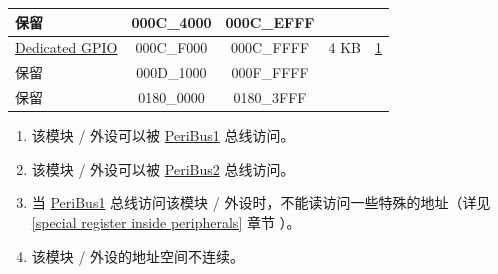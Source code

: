 \begin{longtable}[c]{ |p{5.0cm}|c|c|r|p{1.5cm}| }
    \rowcolor{gray!25}
  保留  & \hexprefix{}000C\_4000 & \hexprefix{}000C\_EFFF &        &              \\\hline
              \hyperref[mod:iomuxgpio]{Dedicated GPIO}     & \hexprefix{}000C\_F000 & \hexprefix{}000C\_FFFF &   4 KB    & \hyperref[PAM footnote: 1]{1}         \\\hline

    \rowcolor{gray!25}
   保留 & \hexprefix{}000D\_1000 & \hexprefix{}000F\_FFFF &        &               \\\hline
    \rowcolor{gray!25}
    保留    & \hexprefix{}0180\_0000 & \hexprefix{}0180\_3FFF &   &         \\

\end{longtable}


\begin{tiplisting}
\vspace{-2em}
\begin{enumerate}
\item \label{PAM footnote: 1}
        该模块 / 外设可以被 \hyperref[PeripheralBus1]{PeriBus1} 总线访问。
\item \label{PAM footnote: 2}
        该模块 / 外设可以被 \hyperref[PeripheralBus2]{PeriBus2}  总线访问。
\item \label{PAM footnote: 3}
        当 \hyperref[PeripheralBus1]{PeriBus1} 总线访问该模块 / 外设时，不能读访问一些特殊的地址（详见 \ref{special register inside peripherals} 章节 ）。
\item \label{PAM footnote: 4}
        该模块 / 外设的地址空间不连续。
\end{enumerate}
\end{tiplisting}
